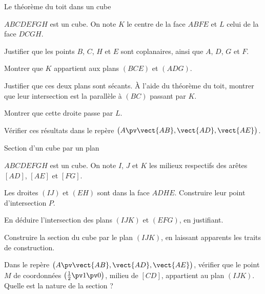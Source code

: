\begin{exercice}[3]{Le théorème du toit dans un cube}
\begin{codecote}[0.58]
$ABCDEFGH$ est un cube. On note $K$ le centre de la face $ABFE$ et $L$ celui de la face $DCGH$.
\begin{questions}
  \item Justifier que les points $B$, $C$, $H$ et $E$ sont coplanaires, ainsi que $A$, $D$, $G$ et $F$.
  \item Montrer que $K$ appartient aux plans $(BCE)$ et $(ADG)$.
  \item Justifier que ces deux plans sont sécants. À l'aide du théorème du toit, montrer que leur intersection est la parallèle à
    $(BC)$ passant par $K$.
  \item Montrer que cette droite passe par $L$.
  \item Vérifier ces résultats dans le repère $\big(A\pv\vect{AB},\vect{AD},\vect{AE}\big)$.
\end{questions}
\cote
\centering
{}
\end{codecote}
\end{exercice}

\begin{exercice}[3]{Section d'un cube par un plan}
\begin{codecote}[0.58]
$ABCDEFGH$ est un cube. On note $I$, $J$ et $K$ les milieux respectifs des arêtes $[AD]$, $[AE]$ et $[FG]$.
\begin{questions}
  \item Les droites $(IJ)$ et $(EH)$ sont dans la face $ADHE$. Construire leur point d'intersection $P$.
  \item En déduire l'intersection des plans $(IJK)$ et $(EFG)$, en justifiant.
  \item Construire la section du cube par le plan $(IJK)$, en laissant apparents les traits de construction.
  \item Dans le repère $\big(A\pv\vect{AB},\vect{AD},\vect{AE}\big)$, vérifier que le point $M$ de coordonnées
    $\left(\frac12\pv1\pv0\right)$, milieu de $[CD]$, appartient au plan $(IJK)$. Quelle est la nature de la section ?
\end{questions}
\cote
\centering
{}
\end{codecote}
\end{exercice}
